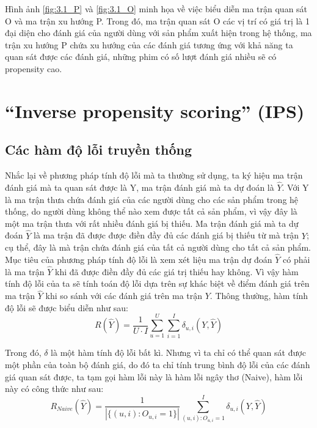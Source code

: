 Hình ảnh \ref{fig:3.1_P} và \ref{fig:3.1_O} minh họa về việc biểu diễn ma trận quan sát O và ma trận xu hướng P. Trong đó, ma trận quan sát O các vị trí có giá trị là 1 đại diện cho đánh giá của người dùng với sản phẩm xuất hiện trong hệ thống, ma trận xu hướng P chứa xu hướng của các đánh giá tương ứng với khả năng ta quan sát được các đánh giá, những phim có số lượt đánh giá nhiều sẽ có propensity cao.

\section{``Inverse propensity scoring'' (IPS)}
\subsection{Các hàm độ lỗi truyền thống}
Nhắc lại về phương pháp tính độ lỗi mà ta thường sử dụng, ta ký hiệu ma trận đánh giá mà ta quan sát được là Y, ma trận đánh giá mà ta dự đoán là $\hat{Y}$. Với Y là ma trận thưa chứa đánh giá của các người dùng cho các sản phẩm trong hệ thống, do người dùng không thể nào xem được tất cả sản phẩm, vì vậy đây là một ma trận thưa với rất nhiều đánh giá bị thiếu. Ma trận đánh giá mà ta dự đoán $\hat{Y}$ là ma trận đã được được điền đầy đủ các đánh giá bị thiếu từ mà trận $Y$; cụ thể, đây là mà trận chứa đánh giá của tất cả người dùng cho tất cả sản phẩm. Mục tiêu của phương pháp tính độ lỗi là xem xét liệu ma trận dự đoán $\hat{Y}$ có phải là ma trận $\hat{Y}$ khi đã được điền đầy đủ các giá trị thiếu hay không. Vì vậy hàm tính độ lỗi của ta sẽ tính toán độ lỗi dựa trên sự khác biệt về điểm đánh giá trên ma trận $\hat{Y}$ khi so sánh với các đánh giá trên ma trận $Y$. Thông thường, hàm tính độ lỗi sẽ được biểu diễn như sau:
\begin{equation}
\label{eq:tradition}
R(\hat{Y}) = \frac{1}{U\cdot I}  \sum_{u=1}^{U} \sum_{i=1}^{I} \delta_{u,i}(Y,\hat{Y})
\end{equation}

Trong đó, $\delta$ là một hàm tính độ lỗi bất kì.
Nhưng vì ta chỉ có thể quan sát được một phần của toàn bộ đánh giá, do đó ta chỉ tính trung bình độ lỗi của các đánh giá quan sát được, ta tạm gọi hàm lỗi này là hàm lỗi ngây thơ (Naive), hàm lỗi này có công thức như sau:
\begin{equation}
\label{eq:naive}
R_{Naive}(\hat{Y}) = \frac{1}{|\{(u,i):O_{u,i} = 1\}|} \sum_{(u,i):O_{u,i}=1}^{I} \delta_{u,i}(Y,\hat{Y}) 
\end{equation}


